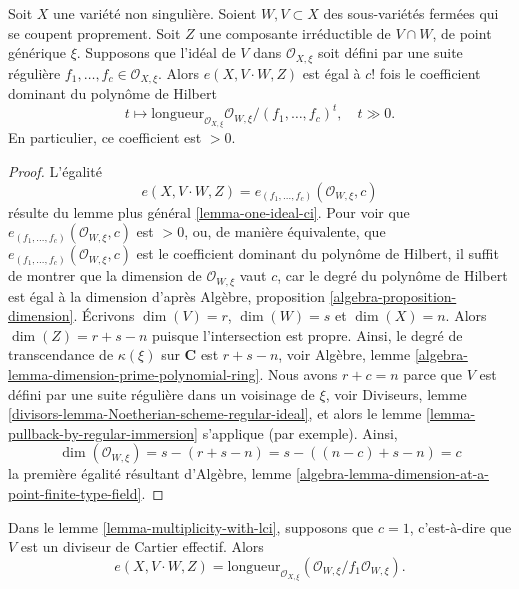 \begin{lemma}
\label{lemma-multiplicity-with-lci}
Soit $X$ une variété non singulière. Soient $W,V \subset X$ des
sous-variétés fermées qui se coupent proprement. Soit $Z$ une composante irréductible
de $V \cap W$, de point générique $\xi$.
Supposons que l'idéal de $V$ dans $\mathcal{O}_{X, \xi}$ soit défini par
une suite régulière $f_1, \ldots, f_c \in \mathcal{O}_{X, \xi}$.
Alors $e(X, V\cdot W, Z)$ est égal à $c!$ fois le coefficient dominant du
polynôme de Hilbert
$$
t \mapsto \text{longueur}_{\mathcal{O}_{X, \xi}}
\mathcal{O}_{W, \xi}/(f_1, \ldots, f_c)^t,\quad t \gg 0.
$$
En particulier, ce coefficient est $> 0$.
\end{lemma}

\begin{proof}
L'égalité
$$
e(X, V\cdot W, Z) = e_{(f_1, \ldots, f_c)}(\mathcal{O}_{W, \xi}, c)
$$
résulte du lemme plus général \ref{lemma-one-ideal-ci}.
Pour voir que $e_{(f_1, \ldots, f_c)}(\mathcal{O}_{W, \xi}, c)$ est
$> 0$, ou, de manière équivalente, que $e_{(f_1, \ldots, f_c)}(\mathcal{O}_{W, \xi}, c)$
est le coefficient dominant du polynôme de Hilbert,
il suffit de montrer que la
dimension de $\mathcal{O}_{W, \xi}$ vaut $c$, car le degré du
polynôme de Hilbert est égal à la dimension d'après
Algèbre, proposition \ref{algebra-proposition-dimension}.
Écrivons $\dim(V) = r$, $\dim(W) = s$ et $\dim(X) = n$. Alors
$\dim(Z) = r + s - n$ puisque l'intersection est propre. Ainsi,
le degré de transcendance de $\kappa(\xi)$ sur $\mathbf{C}$ est
$r + s - n$, voir Algèbre, lemme
\ref{algebra-lemma-dimension-prime-polynomial-ring}.
Nous avons $r + c = n$ parce que $V$ est défini par une suite régulière
dans un voisinage de $\xi$, voir
Diviseurs, lemme \ref{divisors-lemma-Noetherian-scheme-regular-ideal},
et alors le lemme \ref{lemma-pullback-by-regular-immersion}
s'applique (par exemple). Ainsi,
$$
\dim(\mathcal{O}_{W, \xi}) = s - (r + s - n) = s - ((n - c) + s - n) = c
$$
la première égalité résultant d'Algèbre, lemme
\ref{algebra-lemma-dimension-at-a-point-finite-type-field}.
\end{proof}

\begin{lemma}
\label{lemma-multiplicity-with-effective-Cartier-divisor}
Dans le lemme \ref{lemma-multiplicity-with-lci}, supposons que $c = 1$, c'est-à-dire que $V$
est un diviseur de Cartier effectif. Alors
$$
e(X, V \cdot W, Z) =
\text{longueur}_{\mathcal{O}_{X, \xi}}
(\mathcal{O}_{W, \xi}/f_1\mathcal{O}_{W, \xi}).
$$
\end{lemma}

